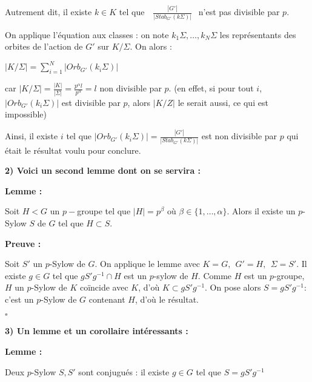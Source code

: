 \documentclass{report}
\renewenvironment{leftbar}{%
  \def\FrameCommand{\vrule width 0.4pt \hspace{10pt}}%
  \MakeFramed {\advance\hsize-\width \FrameRestore}}%
 {\endMakeFramed}%
\newenvironment{preuve}{\vspace*{0.5cm}
    \begin{leftbar}
    \noindent\textbf{Preuve :}\par}{
    \begin{flushright}
    $\square$
    \end{flushright}
    \end{leftbar}
}
\newenvironment{lemme}[2][white]{\begin{tcolorbox}[colframe= #1]
    \textbf{Lemme :} #2  \par}
    {\end{tcolorbox}}
\begin{document}
\begin{enumerate}
            Autrement dit, il existe $k \in K$ tel que $~~~\frac{|G'|}{|Stab_{G'}(k\Sigma)|}~~$ n'est pas divisible par $p.$
            
            
            
            On applique l'équation aux classes : on note $k_1 \Sigma , \dots , k_N\Sigma$ les représentants des orbites de l'action de $G'$ sur $K/ \Sigma $. On alors :
            
            \begin{center}
                $|K/\Sigma |= \displaystyle \sum _{i=1}^N|Orb_{G'}(k_i\Sigma )|$
            \end{center}
           
            car $|K/\Sigma | = \frac{|K|}{|\Sigma|}=\frac{p^\alpha l}{p^\alpha} = l$ non divisible par $p$. (en effet, si pour tout $i$, $|Orb_{G'}(k_i\Sigma)|$ est divisible par $p$, alors $|K/Z|$ le serait aussi, ce qui est impossible)
           
            
           
            Ainsi, il existe $i$ tel que $|Orb_{G'}(k_i\Sigma)| = \frac{|G'|}{|Stab_{G'}(k\Sigma)|} $ est non divisible par $p$ qui était le résultat voulu pour conclure. 
  
\end{enumerate}         
            


\textbf{2) Voici un second lemme dont on se servira :} 
        \begin{lemme}{}
        	Soit $H <G$ un $p-$groupe tel que $|H| = p^\beta $ où $\beta \in \{1, \dots , \alpha \}$. Alors il existe un $p$-Sylow $S$ de $G$ tel que $H \subset S$.
        \end{lemme}
        
        \begin{preuve}
            Soit $S'$ un $p$-Sylow de $G$. On applique le lemme avec $ K =G, ~~ G' = H, ~~\Sigma =S'$. Il existe $g\in G$ tel que $gS'g^{-1}\cap H$ est un $p$-sylow de $H$. Comme $H$ est un $p$-groupe, $H$ un $p$-Sylow de $K$ coïncide avec $K$, d'où $K \subset gS'g^{-1}$. 
            On pose alors $S =  gS'g^{-1} :$ c'est un $p$-Sylow de $G$ contenant $H$, d'où le résultat.
        \end{preuve}    


\textbf{3) Un lemme et un corollaire intéressants :}
        
        \begin{lemme}{}
            Deux $p$-Sylow $S,S'$ sont conjugués : il existe $g\in G$ tel que $S=gS'g^{-1}$
        \end{lemme}
        
\end{document}

